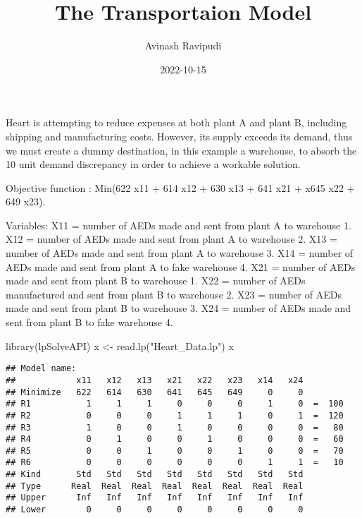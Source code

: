 \documentclass[
]{article}
\title{The Transportaion Model}
\author{Avinash Ravipudi}
\date{2022-10-15}
\newenvironment{Shaded}{\begin{snugshade}}{\end{snugshade}}
\newcommand{\FunctionTok}[1]{\textcolor[rgb]{0.00,0.00,0.00}{#1}}
\newcommand{\NormalTok}[1]{#1}
\newcommand{\OtherTok}[1]{\textcolor[rgb]{0.56,0.35,0.01}{#1}}
\newcommand{\StringTok}[1]{\textcolor[rgb]{0.31,0.60,0.02}{#1}}
\begin{document}
\maketitle

Heart is attempting to reduce expenses at both plant A and plant B,
including shipping and manufacturing costs. However, its supply exceeds
its demand, thus we must create a dummy destination, in this example a
warehouse, to absorb the 10 unit demand discrepancy in order to achieve
a workable solution.

Objective function : Min(622 x11 + 614 x12 + 630 x13 + 641 x21 + x645
x22 + 649 x23).

Variables: X11 = number of AEDs made and sent from plant A to warehouse
1. X12 = number of AEDs made and sent from plant A to warehouse 2. X13 =
number of AEDs made and sent from plant A to warehouse 3. X14 = number
of AEDs made and sent from plant A to fake warehouse 4. X21 = number of
AEDs made and sent from plant B to warehouse 1. X22 = number of AEDs
manufactured and sent from plant B to warehouse 2. X23 = number of AEDs
made and sent from plant B to warehouse 3. X24 = number of AEDs made and
sent from plant B to fake warehouse 4.

\begin{Shaded}
\begin{Highlighting}[]
\FunctionTok{library}\NormalTok{(lpSolveAPI)}
\NormalTok{x }\OtherTok{\textless{}{-}} \FunctionTok{read.lp}\NormalTok{(}\StringTok{"Heart\_Data.lp"}\NormalTok{)}
\NormalTok{x}
\end{Highlighting}
\end{Shaded}

\begin{verbatim}
## Model name: 
##            x11   x12   x13   x21   x22   x23   x14   x24        
## Minimize   622   614   630   641   645   649     0     0        
## R1           1     1     1     0     0     0     1     0  =  100
## R2           0     0     0     1     1     1     0     1  =  120
## R3           1     0     0     1     0     0     0     0  =   80
## R4           0     1     0     0     1     0     0     0  =   60
## R5           0     0     1     0     0     1     0     0  =   70
## R6           0     0     0     0     0     0     1     1  =   10
## Kind       Std   Std   Std   Std   Std   Std   Std   Std        
## Type      Real  Real  Real  Real  Real  Real  Real  Real        
## Upper      Inf   Inf   Inf   Inf   Inf   Inf   Inf   Inf        
## Lower        0     0     0     0     0     0     0     0
\end{verbatim}
\end{document}
